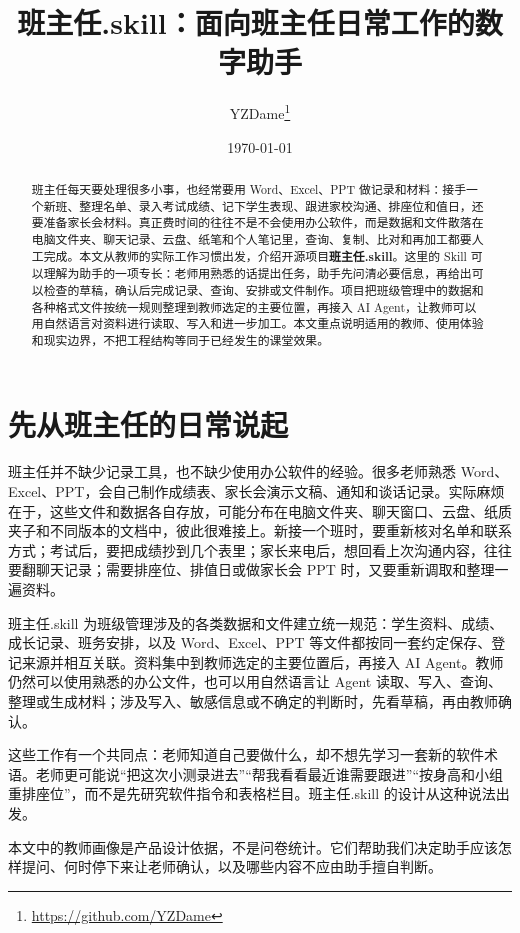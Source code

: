 \documentclass[11pt,a4paper,fontset=none]{ctexart}
\title{\textbf{班主任.skill：面向班主任日常工作的数字助手}}
\author{YZDame\thanks{\href{https://github.com/YZDame}{https://github.com/YZDame}}}
\date{\today}
\begin{document}
\maketitle

\begin{abstract}
班主任每天要处理很多小事，也经常要用 Word、Excel、PPT 做记录和材料：接手一个新班、整理名单、录入考试成绩、记下学生表现、跟进家校沟通、排座位和值日，还要准备家长会材料。真正费时间的往往不是不会使用办公软件，而是数据和文件散落在电脑文件夹、聊天记录、云盘、纸笔和个人笔记里，查询、复制、比对和再加工都要人工完成。本文从教师的实际工作习惯出发，介绍开源项目\textbf{班主任.skill}。这里的 Skill 可以理解为助手的一项专长：老师用熟悉的话提出任务，助手先问清必要信息，再给出可以检查的草稿，确认后完成记录、查询、安排或文件制作。项目把班级管理中的数据和各种格式文件按统一规则整理到教师选定的主要位置，再接入 AI Agent，让教师可以用自然语言对资料进行读取、写入和进一步加工。本文重点说明适用的教师、使用体验和现实边界，不把工程结构等同于已经发生的课堂效果。
\end{abstract}

\section{先从班主任的日常说起}

班主任并不缺少记录工具，也不缺少使用办公软件的经验。很多老师熟悉 Word、Excel、PPT，会自己制作成绩表、家长会演示文稿、通知和谈话记录。实际麻烦在于，这些文件和数据各自存放，可能分布在电脑文件夹、聊天窗口、云盘、纸质夹子和不同版本的文档中，彼此很难接上。新接一个班时，要重新核对名单和联系方式；考试后，要把成绩抄到几个表里；家长来电后，想回看上次沟通内容，往往要翻聊天记录；需要排座位、排值日或做家长会 PPT 时，又要重新调取和整理一遍资料。

班主任.skill 为班级管理涉及的各类数据和文件建立统一规范：学生资料、成绩、成长记录、班务安排，以及 Word、Excel、PPT 等文件都按同一套约定保存、登记来源并相互关联。资料集中到教师选定的主要位置后，再接入 AI Agent。教师仍然可以使用熟悉的办公文件，也可以用自然语言让 Agent 读取、写入、查询、整理或生成材料；涉及写入、敏感信息或不确定的判断时，先看草稿，再由教师确认。

这些工作有一个共同点：老师知道自己要做什么，却不想先学习一套新的软件术语。老师更可能说“把这次小测录进去”“帮我看看最近谁需要跟进”“按身高和小组重排座位”，而不是先研究软件指令和表格栏目。班主任.skill 的设计从这种说法出发。

本文中的教师画像是产品设计依据，不是问卷统计。它们帮助我们决定助手应该怎样提问、何时停下来让老师确认，以及哪些内容不应由助手擅自判断。
\end{document}
